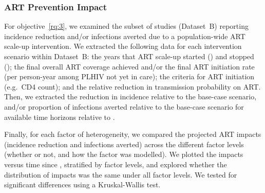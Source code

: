 \subsubsection{ART Prevention Impact}
\label{sss:meth:api}
For objective~\ref{rq:3}, we examined the subset of studies (Dataset~B)
reporting incidence reduction and/or infections averted due to
a population-wide ART scale-up intervention.
We extracted the following data for each intervention scenario within Dataset~B:
the years that ART scale-up started () and stopped ();
the final overall ART coverage achieved and/or
the final ART initiation rate (per person-year among PLHIV not yet in care);
the criteria for ART initiation (e.g.\ CD4 count);
and the relative reduction in transmission probability on ART.
Then, we extracted the
reduction in incidence relative to the base-case scenario, and/or
proportion of infections averted relative to the base-case scenario
for available time horizons relative to .
\par
Finally, for each factor of heterogeneity,
we compared the projected ART impacts (incidence reduction and infections averted)
across the different factor levels (whether or not, and how the factor was modelled).
We plotted the impacts versus time since , stratified by factor levels,
and explored whether the distribution of impacts
was the same under all factor levels.
We tested for significant differences using a Kruskal-Wallis test.